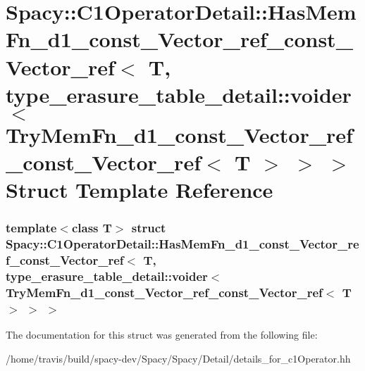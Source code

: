 \hypertarget{structSpacy_1_1C1OperatorDetail_1_1HasMemFn__d1__const__Vector__ref__const__Vector__ref_3_01T_00fc94a4831c9952b6c59d33749e4be1d8}{\section{\-Spacy\-:\-:\-C1\-Operator\-Detail\-:\-:\-Has\-Mem\-Fn\-\_\-d1\-\_\-const\-\_\-\-Vector\-\_\-ref\-\_\-const\-\_\-\-Vector\-\_\-ref$<$ \-T, type\-\_\-erasure\-\_\-table\-\_\-detail\-:\-:voider$<$ \-Try\-Mem\-Fn\-\_\-d1\-\_\-const\-\_\-\-Vector\-\_\-ref\-\_\-const\-\_\-\-Vector\-\_\-ref$<$ \-T $>$ $>$ $>$ \-Struct \-Template \-Reference}
\label{structSpacy_1_1C1OperatorDetail_1_1HasMemFn__d1__const__Vector__ref__const__Vector__ref_3_01T_00fc94a4831c9952b6c59d33749e4be1d8}
}
\subsubsection*{template$<$class T$>$ struct Spacy\-::\-C1\-Operator\-Detail\-::\-Has\-Mem\-Fn\-\_\-d1\-\_\-const\-\_\-\-Vector\-\_\-ref\-\_\-const\-\_\-\-Vector\-\_\-ref$<$ T, type\-\_\-erasure\-\_\-table\-\_\-detail\-::voider$<$ Try\-Mem\-Fn\-\_\-d1\-\_\-const\-\_\-\-Vector\-\_\-ref\-\_\-const\-\_\-\-Vector\-\_\-ref$<$ T $>$ $>$ $>$}



\-The documentation for this struct was generated from the following file\-:\begin{DoxyCompactItemize}
\item 
/home/travis/build/spacy-\/dev/\-Spacy/\-Spacy/\-Detail/details\-\_\-for\-\_\-c1\-Operator.\-hh\end{DoxyCompactItemize}

